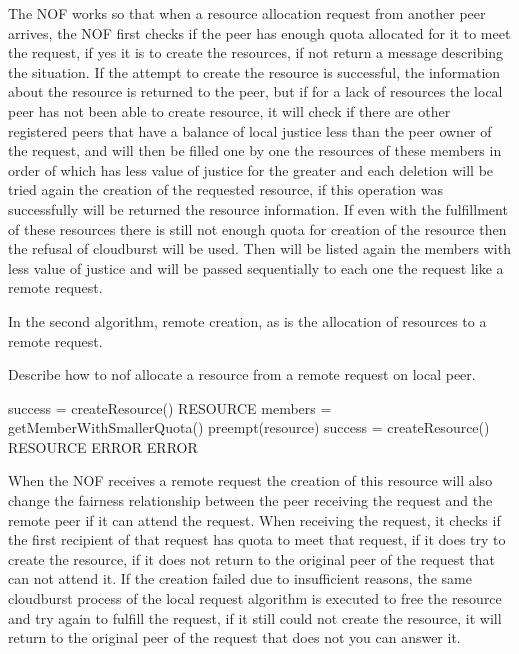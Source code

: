 \documentclass[acmsmall]{acmart}
\begin{document}
The NOF works so that when a resource allocation request from another peer arrives, the NOF first checks if the peer has enough quota allocated for it to meet the request, if yes it is to create the resources, if not return a message describing the situation.
If the attempt to create the resource is successful, the information about the resource is returned to the peer, but if for a lack of resources the local peer has not been able to create resource, it will check if there are other registered peers that have a balance of local justice less than the peer owner of the request, and will then be filled one by one the resources of these members in order of which has less value of justice for the greater and each deletion will be tried again the creation of the  requested resource, if this operation was successfully will be returned the resource information.
If even with the fulfillment of these resources there is still not enough quota for creation of the resource then the refusal of cloudburst will be used.
Then will be listed again the members with less value of justice and will be passed sequentially to each one the request like a remote request.

In the second algorithm, remote creation, as is the allocation of resources to a remote request.

\begin{algorithm}
\caption{Describe how to nof allocate a resource from a remote request on local peer.}
\begin{algorithmic}
        \STATE success = createResource()
            \RETURN RESOURCE
        \ELSE
            \STATE members = getMemberWithSmallerQuota()
                    \STATE preempt(resource)
                    \STATE success = createResource()
                        \RETURN RESOURCE
                    \ENDIF
                \ENDFOR
            \ENDFOR
            \RETURN ERROR
        \ENDIF
    \ELSE
        \RETURN ERROR
    \ENDIF
\end{algorithmic}
\end{algorithm}

When the NOF receives a remote request the creation of this resource will also change the fairness relationship between the peer receiving the request and the remote peer if it can attend the request. When receiving the request, it checks if the first recipient of that request has quota to meet that request, if it does try to create the resource, if it does not return to the original peer of the request that can not attend it.
If the creation failed due to insufficient reasons, the same cloudburst process of the local request algorithm is executed to free the resource and try again to fulfill the request, if it still could not create the resource, it will return to the original peer of the request that does not you can answer it.



\end{document}
